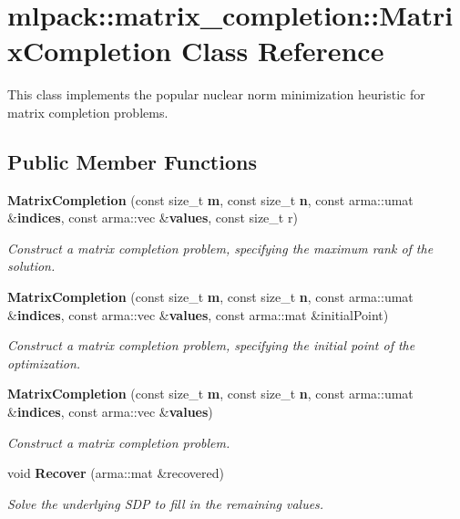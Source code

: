 \section{mlpack\+:\+:matrix\+\_\+completion\+:\+:Matrix\+Completion Class Reference}
\label{classmlpack_1_1matrix__completion_1_1MatrixCompletion}


This class implements the popular nuclear norm minimization heuristic for matrix completion problems.  


\subsection*{Public Member Functions}
\begin{DoxyCompactItemize}
\item 
{\bf Matrix\+Completion} (const size\+\_\+t {\bf m}, const size\+\_\+t {\bf n}, const arma\+::umat \&{\bf indices}, const arma\+::vec \&{\bf values}, const size\+\_\+t r)
\begin{DoxyCompactList}\small\item\em Construct a matrix completion problem, specifying the maximum rank of the solution. \end{DoxyCompactList}\item 
{\bf Matrix\+Completion} (const size\+\_\+t {\bf m}, const size\+\_\+t {\bf n}, const arma\+::umat \&{\bf indices}, const arma\+::vec \&{\bf values}, const arma\+::mat \&initial\+Point)
\begin{DoxyCompactList}\small\item\em Construct a matrix completion problem, specifying the initial point of the optimization. \end{DoxyCompactList}\item 
{\bf Matrix\+Completion} (const size\+\_\+t {\bf m}, const size\+\_\+t {\bf n}, const arma\+::umat \&{\bf indices}, const arma\+::vec \&{\bf values})
\begin{DoxyCompactList}\small\item\em Construct a matrix completion problem. \end{DoxyCompactList}\item 
void {\bf Recover} (arma\+::mat \&recovered)
\begin{DoxyCompactList}\small\item\em Solve the underlying S\+DP to fill in the remaining values. \end{DoxyCompactList}\item 

\end{DoxyCompactItemize}
